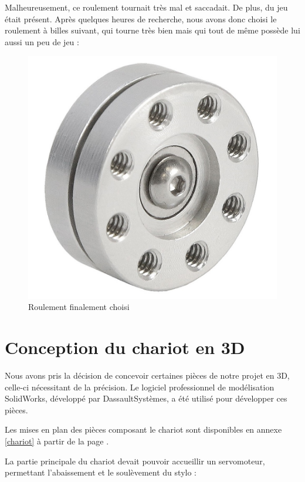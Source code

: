 \documentclass[12pt,a4paper]{report}
\begin{document}
Malheureusement, ce roulement tournait très mal et saccadait. De plus, du jeu était présent. Après quelques heures de recherche, nous avons donc choisi le roulement à billes suivant, qui tourne très bien mais qui tout de même possède lui aussi un peu de jeu :

	\begin{figure}[!h]
 \center
 \includegraphics[scale=0.15]{../pictures/swivelhub}
 \caption{Roulement finalement choisi}
\end{figure}

	
	
	\section{Conception du chariot en 3D}
	
	Nous avons pris la décision de concevoir certaines pièces de notre projet en 3D, celle-ci nécessitant de la précision. Le logiciel professionnel de modélisation SolidWorks, développé par DassaultSystèmes, a été utilisé pour développer ces pièces.
	
	Les mises en plan des pièces composant le chariot sont disponibles en annexe \ref{chariot} à partir de la page \pageref{chariot}.
	
	La partie principale du chariot devait pouvoir accueillir un servomoteur, permettant l'abaissement et le soulèvement du stylo :
	
\end{document}
